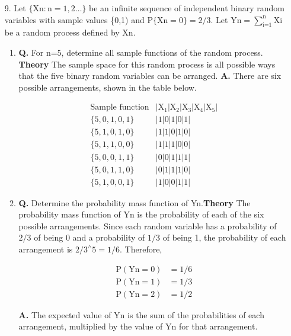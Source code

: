 \documentclass[main.tex]{subfiles}
\begin{document}
\begin{enumerate}
\begin{enumerate}
    \end{enumerate}

\item [9.] Let $\{\mathrm{Xn}: \mathrm{n}=1,2 \ldots\}$ be an infinite sequence of independent binary random variables with sample values \{0,1) and $\mathrm{P}\{\mathrm{Xn}=0\} = 2/3$. Let $\mathrm{Yn}=\sum_{\text{i=1}}^{\text{n}} \mathrm{Xi}$ be a random process defined by $\mathrm{Xn}$.

    \begin{enumerate}
        \item \textbf{Q.} For n=5, determine all sample functions of the random process. \textbf{Theory} The sample space for this random process is all possible ways that the five binary random variables can be arranged. \textbf{A.} There are six possible arrangements, shown in the table below.
        
        $$
        \begin{array}{ll}
        \text {Sample function} & | \mathrm{X_1} | \mathrm{X_2} | \mathrm{X_3} | \mathrm{X_4} | \mathrm{X_5} | \\
        \{5,0,1,0,1\} & |1| 0|1| 0|1| \\ 
        \{5,1,0,1,0\} & |1| 1|0| 1|0| \\ 
        \{5,1,1,0,0\} & |1| 1|1| 0|0| \\ 
        \{5,0,0,1,1\} & |0| 0|1| 1|1| \\ 
        \{5,0,1,1,0\} & |0| 1|1| 1|0| \\ 
        \{5,1,0,0,1\} & |1| 0|0| 1|1|
        \end{array}
        $$
        
        \item \textbf{Q.} Determine the probability mass function of Yn.\textbf{Theory} The probability mass function of $\mathrm{Yn}$ is the probability of each of the six possible arrangements. Since each random variable has a probability of $2/3$ of being 0 and a probability of $1/3$ of being 1, the probability of each arrangement is $2/3^{\wedge} 5 = 1/6$. Therefore,
        
        $$
        \begin{aligned}
        \mathrm{P}(\mathrm{Yn}=0) & = 1/6 \\
        \mathrm{P}(\mathrm{Yn}=1) & = 1/3 \\
        \mathrm{P}(\mathrm{Yn}=2) & = 1/2
        \end{aligned}
        $$
        
        \textbf {A.} The expected value of $\mathrm{Yn}$ is the sum of the probabilities of each arrangement, multiplied by the value of $\mathrm{Yn}$ for that arrangement.
        

\end{enumerate}
\end{enumerate}
\end{document}
